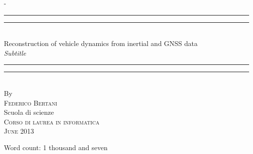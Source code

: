 \begin{titlingpage}
\begin{SingleSpace}
\calccentering{\unitlength} 
\begin{adjustwidth*}{\unitlength}{-\unitlength}
\vspace*{13mm}
\begin{center}
\rule[0.5ex]{\linewidth}{2pt}\vspace*{-\baselineskip}\vspace*{3.2pt}
\rule[0.5ex]{\linewidth}{1pt}\\[\baselineskip]
{\HUGE Reconstruction of vehicle dynamics from inertial and GNSS data }\\[4mm]
{\Large \textit{Subtitle}}\\
\rule[0.5ex]{\linewidth}{1pt}\vspace*{-\baselineskip}\vspace{3.2pt}
\rule[0.5ex]{\linewidth}{2pt}\\
\vspace{6.5mm}
{\large By}\\
\vspace{6.5mm}
{\large\textsc{Federico Bertani}}\\
\vspace{11mm}
{\large Scuola di scienze\\
\textsc{Corso di laurea in informatica}}\\
\vspace{9mm}
{\large\textsc{June 2013}}
\vfill
\end{center}
\begin{flushright}
{\small Word count: 1 thousand and seven}
\end{flushright}
\end{adjustwidth*}
\end{SingleSpace}
\end{titlingpage}